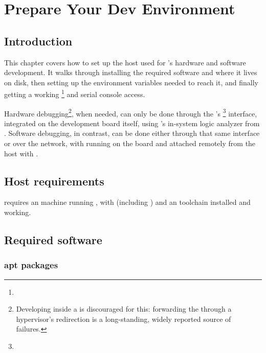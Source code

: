 \chapter{Prepare Your Dev Environment}
\label{chap:fpgalix-devenv}

\section{Introduction}

This chapter covers how to set up the host used for 's hardware and software development. It walks through installing the required software and where it lives on disk, then setting up the environment variables needed to reach it, and finally getting a working \footnote{} and serial console access.

Hardware debugging\footnote{Developing inside a  is discouraged for this: forwarding the  through a hypervisor's  redirection is a long-standing, widely reported source of  failures.}, when needed, can only be done through the 's \footnote{} interface, integrated on the development board itself, using 's in-system logic analyzer from . Software debugging, in contrast, can be done either through that same interface or over the network, with  running on the board and attached remotely from the host with .

\section{Host requirements}

 requires an  machine running , with  (including ) and an  toolchain installed and working.

\section{Required software}

\subsection{apt packages}
\label{subsec:fpgalix-apt-packages}

